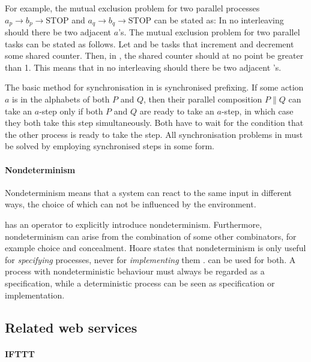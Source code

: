 For example, the mutual exclusion problem for two parallel processes $a_p \to b_p \to \text{STOP} $ and $a_q \to b_q \to \text{STOP}$ can be stated as:
In no interleaving should there be two adjacent $a$'s.
%
The mutual exclusion problem for two parallel tasks can be stated as follows.
Let  and  be tasks that increment and decrement some shared counter.
Then, in , the shared counter should at no point be greater than 1.
This means that in no interleaving should there be two adjacent 's.

The basic method for synchronisation in \CSP is synchronised prefixing.
If some action $a$ is in the alphabets of both $P$ and $Q$, then their parallel composition $P \parallel Q$ can take an $a$-step only if both $P$ and $Q$ are ready to take an $a$-step, in which case they both take this step simultaneously.
Both have to wait for the condition that the other process is ready to take the step.
All synchronisation problems in \CSP must be solved by employing synchronised steps in some form.



\paragraph{Nondeterminism}

Nondeterminism means that a system can react to the same input in different ways, the choice of which can not be influenced by the environment.

\CSP has an operator to explicitly introduce nondeterminism.
Furthermore, nondeterminism can arise from the combination of some other combinators, for example choice and concealment.
%
Hoare states that nondeterminism is only useful for \emph{specifying} processes, never for \emph{implementing} them \cite{books/Hoare85CSP}.
\CSP can be used for both.
A process with nondeterministic behaviour must always be regarded as a specification, while a deterministic process can be seen as specification or implementation.



\subsection{Related web services}


\paragraph{IFTTT}

